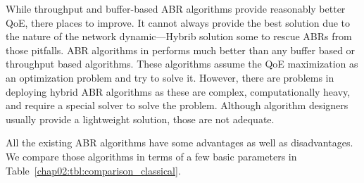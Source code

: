 While throughput and buffer-based ABR algorithms provide reasonably better QoE, there places to improve. It cannot always provide the best solution due to the nature of the network dynamic—Hybrib solution some to rescue ABRs from those pitfalls. ABR algorithms in \cite{7247436,140405,yin2015control,10.1145/2670518.2673877} performs much better than any buffer based or throughput based algorithms. These algorithms assume the QoE maximization as an optimization problem and try to solve it. However, there are problems in deploying hybrid ABR algorithms as these are complex, computationally heavy, and require a special solver to solve the problem. Although algorithm designers usually provide a lightweight solution, those are not adequate.

All the existing ABR algorithms have some advantages as well as disadvantages. We compare those algorithms in terms of a few basic parameters in Table~\ref{chap02:tbl:comparison_classical}.


